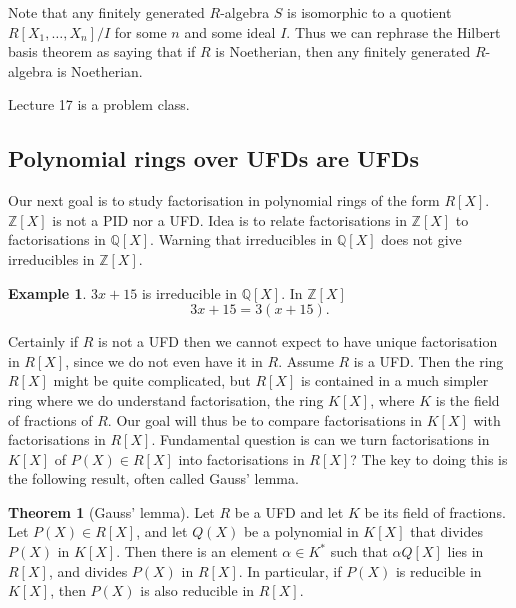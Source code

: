 \documentclass{article}
\newcommand{\Z}{\mathbb{Z}}
\newcommand{\Q}{\mathbb{Q}}
\newcommand{\rb}[1]{\left( #1 \right)}
\renewcommand{\sb}[1]{\left[ #1 \right]}
\theoremstyle{definition}\newtheorem{definition}{Definition}[subsection]
\theoremstyle{definition}\newtheorem{remark}[definition]{Remark}
\theoremstyle{definition}\newtheorem*{example}{Example}
\theoremstyle{definition}\newtheorem*{note}{Note}
\newtheorem{theorem}[definition]{Theorem}
\begin{document}
Note that any finitely generated $ R $-algebra $ S $ is isomorphic to a quotient $ R\sb{X_1, \dots, X_n} / I $ for some $ n $ and some ideal $ I $. Thus we can rephrase the Hilbert basis theorem as saying that if $ R $ is Noetherian, then any finitely generated $ R $-algebra is Noetherian.


Lecture 17 is a problem class.


\subsection{Polynomial rings over UFDs are UFDs}

Our next goal is to study factorisation in polynomial rings of the form $ R\sb{X} $. $ \Z\sb{X} $ is not a PID nor a UFD. Idea is to relate factorisations in $ \Z\sb{X} $ to factorisations in $ \Q\sb{X} $. Warning that irreducibles in $ \Q\sb{X} $ does not give irreducibles in $ \Z\sb{X} $.

\begin{example}
$ 3x + 15 $ is irreducible in $ \Q\sb{X} $. In $ \Z\sb{X} $
$$ 3x + 15 = 3\rb{x + 15}. $$
\end{example}

Certainly if $ R $ is not a UFD then we cannot expect to have unique factorisation in $ R\sb{X} $, since we do not even have it in $ R $. Assume $ R $ is a UFD. Then the ring $ R\sb{X} $ might be quite complicated, but $ R\sb{X} $ is contained in a much simpler ring where we do understand factorisation, the ring $ K\sb{X} $, where $ K $ is the field of fractions of $ R $. Our goal will thus be to compare factorisations in $ K\sb{X} $ with factorisations in $ R\sb{X} $. Fundamental question is can we turn factorisations in $ K\sb{X} $ of $ P\rb{X} \in R\sb{X} $ into factorisations in $ R\sb{X} $? The key to doing this is the following result, often called Gauss' lemma.

\begin{theorem}[Gauss' lemma]
\label{thm:9.2.1}
Let $ R $ be a UFD and let $ K $ be its field of fractions. Let $ P\rb{X} \in R\sb{X} $, and let $ Q\rb{X} $ be a polynomial in $ K\sb{X} $ that divides $ P\rb{X} $ in $ K\sb{X} $. Then there is an element $ \alpha \in K^* $ such that $ \alpha Q\sb{X} $ lies in $ R\sb{X} $, and divides $ P\rb{X} $ in $ R\sb{X} $. In particular, if $ P\rb{X} $ is reducible in $ K\sb{X} $, then $ P\rb{X} $ is also reducible in $ R\sb{X} $.
\end{theorem}
\end{document}
